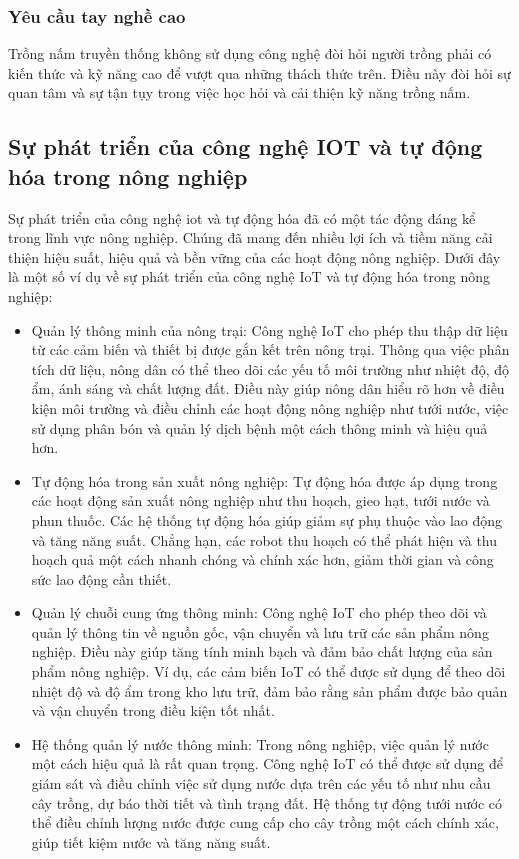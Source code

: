 \subsubsection{Yêu cầu tay nghề cao}
Trồng nấm truyền thống không sử dụng công nghệ đòi hỏi người trồng phải có kiến thức và kỹ năng cao để vượt qua những thách thức trên. Điều này đòi hỏi sự quan tâm và sự tận tụy trong việc học hỏi và cải thiện kỹ năng trồng nấm.

\subsection{Sự phát triển của công nghệ IOT và tự động hóa trong nông nghiệp}

Sự phát triển của công nghệ \acrfull{iot} và tự động hóa đã có một tác động đáng kể trong lĩnh vực nông nghiệp. Chúng đã mang đến nhiều lợi ích và tiềm năng cải thiện hiệu suất, hiệu quả và bền vững của các hoạt động nông nghiệp. Dưới đây là một số ví dụ về sự phát triển của công nghệ IoT và tự động hóa trong nông nghiệp:

\begin{itemize}
    \item Quản lý thông minh của nông trại: Công nghệ IoT cho phép thu thập dữ liệu từ các cảm biến và thiết bị được gắn kết trên nông trại. Thông qua việc phân tích dữ liệu, nông dân có thể theo dõi các yếu tố môi trường như nhiệt độ, độ ẩm, ánh sáng và chất lượng đất. Điều này giúp nông dân hiểu rõ hơn về điều kiện môi trường và điều chỉnh các hoạt động nông nghiệp như tưới nước, việc sử dụng phân bón và quản lý dịch bệnh một cách thông minh và hiệu quả hơn.
    \item Tự động hóa trong sản xuất nông nghiệp: Tự động hóa được áp dụng trong các hoạt động sản xuất nông nghiệp như thu hoạch, gieo hạt, tưới nước và phun thuốc. Các hệ thống tự động hóa giúp giảm sự phụ thuộc vào lao động và tăng năng suất. Chẳng hạn, các robot thu hoạch có thể phát hiện và thu hoạch quả một cách nhanh chóng và chính xác hơn, giảm thời gian và công sức lao động cần thiết.
    \item Quản lý chuỗi cung ứng thông minh: Công nghệ IoT cho phép theo dõi và quản lý thông tin về nguồn gốc, vận chuyển và lưu trữ các sản phẩm nông nghiệp. Điều này giúp tăng tính minh bạch và đảm bảo chất lượng của sản phẩm nông nghiệp. Ví dụ, các cảm biến IoT có thể được sử dụng để theo dõi nhiệt độ và độ ẩm trong kho lưu trữ, đảm bảo rằng sản phẩm được bảo quản và vận chuyển trong điều kiện tốt nhất.
    \item Hệ thống quản lý nước thông minh: Trong nông nghiệp, việc quản lý nước một cách hiệu quả là rất quan trọng. Công nghệ IoT có thể được sử dụng để giám sát và điều chỉnh việc sử dụng nước dựa trên các yếu tố như nhu cầu cây trồng, dự báo thời tiết và tình trạng đất. Hệ thống tự động tưới nước có thể điều chỉnh lượng nước được cung cấp cho cây trồng một cách chính xác, giúp tiết kiệm nước và tăng năng suất.
\end{itemize}

